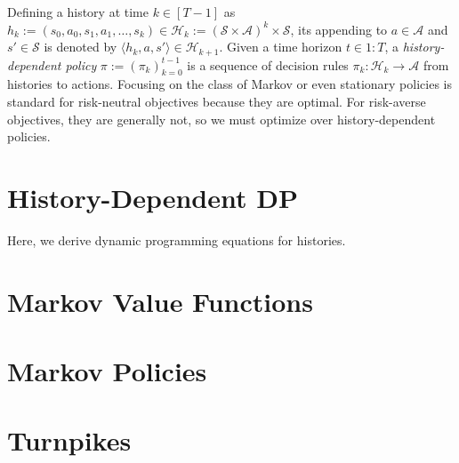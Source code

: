 Defining a history at time $k \in [T-1]$ as $h_k := (s_0, a_0, s_1, a_1, \dots , s_{k}) \in  \mathcal{H}_k := (\mathcal{S}  \times \mathcal{A})^k \times  \mathcal{S}$, its appending to $a\in \mathcal{A} $ and $s'\in \mathcal{S} $ is denoted by $\langle h_k, a, s' \rangle \in \mathcal{H}_{k+1}$.
Given a time horizon $t\in 1{:}T$, a \emph{history-dependent policy} $\pi := (\pi_k)_{k=0}^{t-1}$ is a sequence of decision rules $\pi_k\colon \mathcal{H}_k \to \mathcal{A}$ from histories to actions. Focusing on the class of Markov or even stationary policies is standard for risk-neutral objectives because they are optimal. For risk-averse objectives, they are generally not, so we must optimize over history-dependent policies. 





\section{History-Dependent DP}

Here, we derive dynamic programming equations for histories.

\section{Markov Value Functions}


\section{Markov Policies}

\section{Turnpikes}

